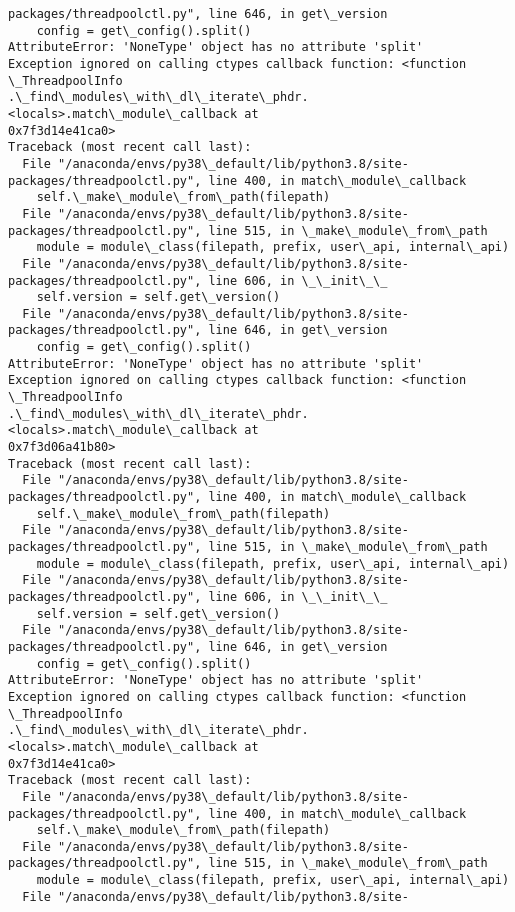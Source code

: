 \documentclass[11pt]{article}
\begin{document}
\begin{Verbatim}[commandchars=\\\{\}]
packages/threadpoolctl.py", line 646, in get\_version
    config = get\_config().split()
AttributeError: 'NoneType' object has no attribute 'split'
Exception ignored on calling ctypes callback function: <function \_ThreadpoolInfo
.\_find\_modules\_with\_dl\_iterate\_phdr.<locals>.match\_module\_callback at
0x7f3d14e41ca0>
Traceback (most recent call last):
  File "/anaconda/envs/py38\_default/lib/python3.8/site-
packages/threadpoolctl.py", line 400, in match\_module\_callback
    self.\_make\_module\_from\_path(filepath)
  File "/anaconda/envs/py38\_default/lib/python3.8/site-
packages/threadpoolctl.py", line 515, in \_make\_module\_from\_path
    module = module\_class(filepath, prefix, user\_api, internal\_api)
  File "/anaconda/envs/py38\_default/lib/python3.8/site-
packages/threadpoolctl.py", line 606, in \_\_init\_\_
    self.version = self.get\_version()
  File "/anaconda/envs/py38\_default/lib/python3.8/site-
packages/threadpoolctl.py", line 646, in get\_version
    config = get\_config().split()
AttributeError: 'NoneType' object has no attribute 'split'
Exception ignored on calling ctypes callback function: <function \_ThreadpoolInfo
.\_find\_modules\_with\_dl\_iterate\_phdr.<locals>.match\_module\_callback at
0x7f3d06a41b80>
Traceback (most recent call last):
  File "/anaconda/envs/py38\_default/lib/python3.8/site-
packages/threadpoolctl.py", line 400, in match\_module\_callback
    self.\_make\_module\_from\_path(filepath)
  File "/anaconda/envs/py38\_default/lib/python3.8/site-
packages/threadpoolctl.py", line 515, in \_make\_module\_from\_path
    module = module\_class(filepath, prefix, user\_api, internal\_api)
  File "/anaconda/envs/py38\_default/lib/python3.8/site-
packages/threadpoolctl.py", line 606, in \_\_init\_\_
    self.version = self.get\_version()
  File "/anaconda/envs/py38\_default/lib/python3.8/site-
packages/threadpoolctl.py", line 646, in get\_version
    config = get\_config().split()
AttributeError: 'NoneType' object has no attribute 'split'
Exception ignored on calling ctypes callback function: <function \_ThreadpoolInfo
.\_find\_modules\_with\_dl\_iterate\_phdr.<locals>.match\_module\_callback at
0x7f3d14e41ca0>
Traceback (most recent call last):
  File "/anaconda/envs/py38\_default/lib/python3.8/site-
packages/threadpoolctl.py", line 400, in match\_module\_callback
    self.\_make\_module\_from\_path(filepath)
  File "/anaconda/envs/py38\_default/lib/python3.8/site-
packages/threadpoolctl.py", line 515, in \_make\_module\_from\_path
    module = module\_class(filepath, prefix, user\_api, internal\_api)
  File "/anaconda/envs/py38\_default/lib/python3.8/site-

\end{Verbatim}
\end{document}
